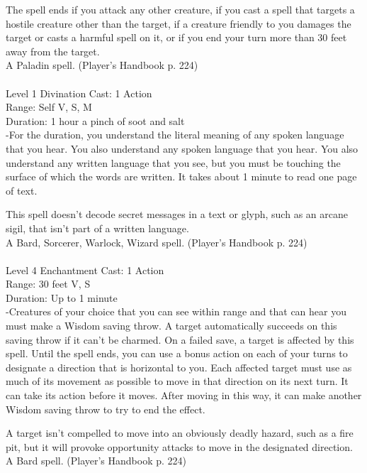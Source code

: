 \documentclass[10pt,twocolumn]{report}
\begin{document}
The spell ends if you attack any other creature, if you cast a spell that targets a hostile creature other than the target, if a creature friendly to you damages the target or casts a harmful spell on it, or if you end your turn more than 30 feet away from the target.\\
A Paladin spell. (Player's Handbook p. 224) \\


 \\
Level 1 \quad Divination \quad Cast: 1 Action\\
Range: Self \quad V, S, M \\
Duration: 1 hour \quad a pinch of soot and salt\\
-For the duration, you understand the literal meaning of any spoken language that you hear. 
You also understand any spoken language that you hear. You also understand any written language that you see, but you must be touching the surface of which the words are written. It takes about 1 minute to read one page of text. 

This spell doesn’t decode secret messages in a text or glyph, such as an arcane sigil, that isn’t part of a written language.\\
A Bard, Sorcerer, Warlock, Wizard spell. (Player's Handbook p. 224) \\


 \\
Level 4 \quad Enchantment \quad Cast: 1 Action\\
Range: 30 feet \quad V, S\\
Duration: Up to 1 minute \quad \\
-Creatures of your choice that you can see within range and that can hear you must make a Wisdom saving throw. 
A target automatically succeeds on this saving throw if it can’t be charmed. On a failed save, a target is affected by this spell. Until the spell ends, you can use a bonus action on each of your turns to designate a direction that is horizontal to you. Each affected target must use as much of its movement as possible to move in that direction on its next turn. It can take its action before it moves. After moving in this way, it can make another Wisdom saving throw to try to end the effect. 

A target isn’t compelled to move into an obviously deadly hazard, such as a fire pit, but it will provoke opportunity attacks to move in the designated direction.\\
A Bard spell. (Player's Handbook p. 224) \\
\end{document}
